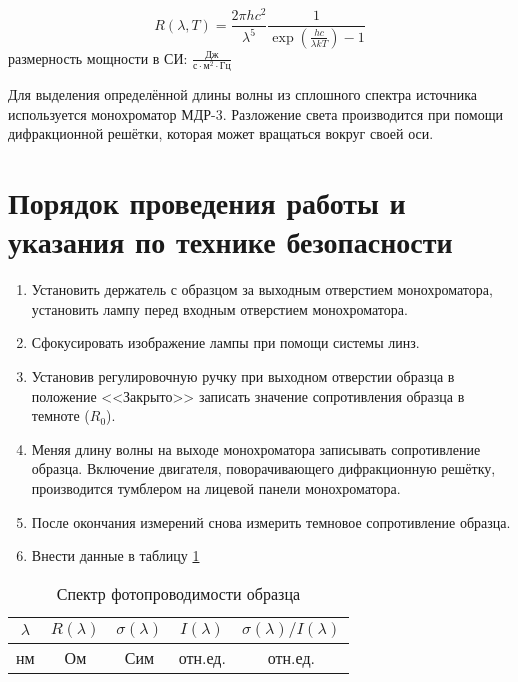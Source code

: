 \begin{equation}
R(\lambda, T) = \frac{2 \pi h c^2}{\lambda^5} \frac{1}{\exp \left( \frac{h c}{\lambda k T} \right) - 1}
\label{eq7_intencity}
\end{equation}
размерность мощности в СИ: $\frac{\text{Дж}}{\text{с} \cdot \text{м}^2 \cdot \text{Гц}}$

Для выделения определённой длины волны из сплошного спектра источника используется монохроматор МДР-3. Разложение света производится при помощи дифракционной решётки, которая может вращаться вокруг своей оси.

\section{Порядок проведения работы и указания по технике безопасности}

\begin{enumerate}
\item Установить держатель с образцом за выходным отверстием монохроматора, установить лампу перед входным отверстием монохроматора.
\item Сфокусировать изображение лампы при помощи системы линз.
\item Установив регулировочную ручку при выходном отверстии образца в положение <<Закрыто>> записать значение сопротивления образца в темноте ($R_{0}$).
\item Меняя длину волны на выходе монохроматора записывать сопротивление образца. Включение двигателя, поворачивающего дифракционную решётку, производится тумблером на лицевой панели монохроматора.
\item После окончания измерений снова измерить темновое сопротивление образца.
\item Внести данные в таблицу \ref{table7_data}
\end{enumerate}

\begin{table}[h!]
\caption{Спектр фотопроводимости образца}
\begin{center}
\begin{tabular}{c|c|c|c|c}
$\lambda$ & $R(\lambda)$ & $\sigma(\lambda)$ & $I(\lambda)$ & $\sigma(\lambda) / I(\lambda)$ \\
\hline
нм & Ом & Сим & отн.ед. & отн.ед. \\
\hline
\end{tabular}
\end{center}
\label{table7_data}
\end{table}

